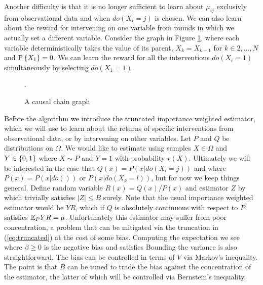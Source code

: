 Another difficulty is that it is no longer sufficient to learn about $\mu_{ij}$ exclusivly from observational data and when $do(X_i = j)$ is chosen.
We can also learn about the reward for intervening on one variable from rounds in which we actually set a different variable.
Consider the graph in Figure \ref{fig:causalchain}, where each variable deterministically takes the value of its parent, $X_k = X_{k-1}$ 
for $k\in {2,\ldots,N}$ and $\P{X_1} = 0$. 
We can learn the reward for all the interventions $do(X_i = 1)$ simultaneously by selecting $do(X_1 = 1)$. 

\begin{figure}[h]
\centering
\caption{A causal chain graph}.
\label{fig:causalchain}
\end{figure} 



Before the algorithm we introduce the truncated importance weighted estimator, which we will use to learn about the returns of 
specific interventions from observational data, or by intervening on other variables. Let $P$ and $Q$ be distributions on $\Omega$.
We would like to estimate
using samples $X \in \Omega$ and $Y \in \set{0,1}$ where $X \sim P$ and $Y = 1$ with probability $r(X)$. Ultimately we will be interested
in the case that 
$Q(x) = P(x|do(X_i = j))$
and where $P(x) = P(x|do())$ or $P(x|do(X_k = l))$, but for now we keep things general.
Define random variable $R(x) = Q(x)/P(x)$ and estimator $Z$ by
which trivially satisfies $|Z| \leq B$ surely.
Note that the usual importance weighted estimator would be $YR$, which if $Q$ is absolutely continuous with respect to $P$ satisfies $\EE_P YR = \mu$. Unfortunately
this estimator may suffer from poor concentration, a problem that can be mitigated via the truncation in (\ref{eq:truncated}) at the cost of some bias.
Computing the expectation we see
where $\beta \geq 0$ is the negative bias and satisfies
Bounding the variance is also straightforward.
The bias can be controlled in terms of $V$ via Markov's inequality.
The point is that $B$ can be tuned to trade the bias against the concentration of the estimator,
the latter of which will be controlled via Bernstein's inequality. 

